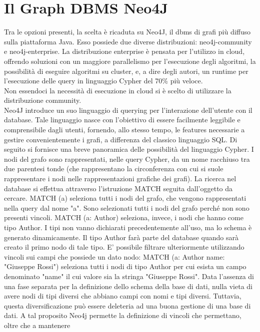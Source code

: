 \documentclass[a4paper,12pt]{article}
\begin{document}
\section*{Il Graph DBMS Neo4J}
Tra le opzioni presenti, la scelta è ricaduta su Neo4J, il dbms di grafi più 
diffuso sulla piattaforma Java. Esso possiede due diverse distribuzioni: 
neo4j-community e neo4j-enterprise. La distribuzione enterprise è pensata per 
l'utilizzo in cloud, offrendo soluzioni con un maggiore parallelismo per 
l'esecuzione degli algoritmi, la possibilità di eseguire algoritmi su cluster, 
e, a dire degli autori, un runtime per l'esecuzione delle query in linguaggio 
Cypher del 70\% più veloce. \\
Non essendoci la necessità di esecuzione in cloud si è scelto di utilizzare 
la distribuzione community. \\
Neo4J introduce un suo linguaggio di querying per l'interazione dell'utente con 
il database. Tale linguaggio nasce con l'obiettivo di essere facilmente 
leggibile e comprensibile dagli utenti, fornendo, allo stesso tempo, le 
features necessarie a gestire convenientemente i grafi, a differenza del 
classico linguaggio SQL.
Di seguito si fornisce una breve panoramica delle possibilità del linguaggio 
Cypher.
I nodi del grafo sono rappresentati, nelle query Cypher, da un nome racchiuso 
tra due parentesi tonde (che rappresentano la circonferenza con cui si suole 
rappresentare i nodi nelle rappresentazioni grafiche dei grafi). La ricerca nel 
database si effettua attraverso l'istruzione MATCH seguita dall'oggetto da 
cercare.
MATCH (a) seleziona tutti i nodi del grafo, che vengono rappresentati nella 
query dal nome "a". Sono selezionati tutti i nodi del grafo perché non sono 
presenti vincoli.
MATCH (a: Author) seleziona, invece, i nodi che hanno come tipo Author. I tipi 
non vanno dichiarati precedentemente all'uso, ma lo schema è generato 
dinamicamente. Il tipo Author farà parte del database quando sarà creato il 
primo nodo di tale tipo.
E' possibile filtrare ulteriormente utilizzando vincoli sui campi che possiede 
un dato nodo:
MATCH (a: Author {name: "Giuseppe Rossi"}) seleziona tutti i nodi di tipo 
Author per cui esista un campo denominato "name" il cui valore sia la stringa 
"Giuseppe Rossi". Data l'assenza di una fase separata per la definizione dello 
schema della base di dati, nulla vieta di avere nodi di tipi diversi che 
abbiano campi con nomi e tipi diversi. Tuttavia, questa diversificazione può 
essere deleteria ad una buona gestione di una base di dati. A tal proposito
Neo4j permette la definizione di vincoli che permettano, oltre che a mantenere
\end{document}
